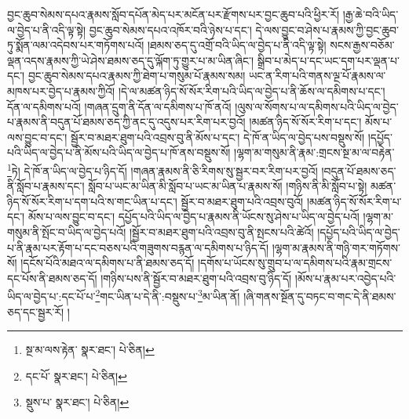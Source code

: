 བྱང་ཆུབ་སེམས་དཔའ་རྣམས་སློབ་དཔོན་མེད་པར་མངོན་པར་རྫོགས་པར་བྱང་ཆུབ་པའི་ཕྱིར་རོ། །རྒྱ་ཆེ་བའི་ཡིད་ལ་བྱེད་པ་ནི་འདི་ལྟ་སྟེ། བྱང་ཆུབ་སེམས་དཔའ་འཁོར་བའི་ཉེས་པ་དང་། དེ་ལས་བྱུང་བ་ཤེས་པ་རྣམས་ཀྱི་བྱང་ཆུབ་ཏུ་སྨོན་ལམ་འདེབས་པར་གཏོགས་པའོ། །ཐམས་ཅད་དུ་འགྲོ་བའི་ཡིད་ལ་བྱེད་པ་ནི་འདི་ལྟ་སྟེ། སངས་རྒྱས་བཅོམ་ལྡན་འདས་རྣམས་ཀྱི་ཡེ་ཤེས་ཐམས་ཅད་དུ་ལྐོག་ཏུ་གྱུར་པ་མ་ཡིན་ཞིང་། སྒྲིབ་པ་མེད་པ་དང་ཡང་དག་པར་ལྡན་པ་དང་། བྱང་ཆུབ་སེམས་དཔའ་རྣམས་ཀྱི་ཐེག་པ་གསུམ་པོ་རྣམས་སམ། ཡང་ན་རིག་པའི་གནས་ལྔ་པོ་རྣམས་ལ་མཁས་པར་བྱེད་པ་རྣམས་ཀྱིའོ། །དེ་ལ་མཚན་ཉིད་སོ་སོར་རིག་པའི་ཡིད་ལ་བྱེད་པ་ནི་ཆོས་ལ་དམིགས་པ་དང་། དོན་ལ་དམིགས་པའོ། །གཞན་དྲུག་ནི་དོན་ལ་དམིགས་པ་ཁོ་ནའོ། །ལུས་ལ་སོགས་པ་ལ་དམིགས་པའི་ཡིད་ལ་བྱེད་པ་རྣམས་ནི་བདུན་པོ་ཐམས་ཅད་ཀྱི་ནང་དུ་འདུས་པར་རིག་པར་བྱའོ། །མཚན་ཉིད་སོ་སོར་རིག་པ་དང་། མོས་པ་ལས་བྱུང་བ་དང་། སྦྱོར་བ་མཐར་ཐུག་པའི་འབྲས་བུ་ནི་མོས་པ་དང་། དེ་ཁོ་ན་ཡིད་ལ་བྱེད་པས་བསྡུས་སོ། །དཔྱོད་པའི་ཡིད་ལ་བྱེད་པ་ནི་མོས་པའི་ཡིད་ལ་བྱེད་པ་ཁོ་ནས་བསྡུས་སོ། །ལྷག་མ་གསུམ་ནི་རྣམ་:གྲངས་སྔ་མ་ལ་བརྟེན་\footnote{སྔ་མ་ལས་རྟེན་  སྣར་ཐང་།  པེ་ཅིན། }ཏེ། དེ་ཁོ་ན་ཡིད་ལ་བྱེད་པ་ཉིད་དོ། །གཞན་རྣམས་ནི་ཅི་རིགས་སུ་སྦྱར་བར་རིག་པར་བྱའོ། །བདུན་པོ་ཐམས་ཅད་ནི་སློབ་པ་རྣམས་དང་། སློབ་པ་ཡང་མ་ཡིན་མི་སློབ་པ་ཡང་མ་ཡིན་པ་རྣམས་སོ། །གཉིས་ནི་མི་སློབ་པ་སྟེ། མཚན་ཉིད་སོ་སོར་རིག་པ་དག་པའི་ས་གང་ཡིན་པ་དང་། སྦྱོར་བ་མཐར་ཐུག་པའི་འབྲས་བུའོ། །མཚན་ཉིད་སོ་སོར་རིག་པ་དང་། མོས་པ་ལས་བྱུང་བ་དང་། དཔྱོད་པའི་ཡིད་ལ་བྱེད་པ་རྣམས་ནི་ཡོངས་སུ་ཤེས་པ་ཡིད་ལ་བྱེད་པའོ། །ལྷག་མ་གསུམ་ནི་སྤོང་བ་ཡིད་ལ་བྱེད་པའོ། །སྦྱོར་བ་མཐར་ཐུག་པའི་འབྲས་བུ་ནི་སྤངས་པའི་ཚེའོ། །དཔྱོད་པའི་ཡིད་ལ་བྱེད་པ་ནི་རྣམ་པར་རྟོག་པ་དང་བཅས་པའི་གཟུགས་བརྙན་ལ་དམིགས་པ་ཉིད་དོ། །ལྷག་མ་རྣམས་ནི་གཉི་གར་གཏོགས་སོ། །དངོས་པོའི་མཐའ་ལ་དམིགས་པ་ནི་ཐམས་ཅད་དོ། །དགོས་པ་ཡོངས་སུ་གྲུབ་པ་ལ་དམིགས་པའི་རྣམ་གྲངས་དང་པོས་ནི་ཐམས་ཅད་དོ། །གཉིས་པས་ནི་སྦྱོར་བ་མཐར་ཐུག་པའི་འབྲས་བུ་ཉིད་དོ། །མོས་པ་རྣམ་པར་འབྱེད་པའི་ཡིད་ལ་བྱེད་པ་:དང་པོ་པ་\footnote{དང་པོ་  སྣར་ཐང་།  པེ་ཅིན། }གང་ཡིན་པ་དེ་ནི་:བསྡུས་པ་\footnote{སྡུས་པ་  སྣར་ཐང་།  པེ་ཅིན། }མ་ཡིན་ནོ། །ཞི་གནས་སྔོན་དུ་བཏང་བ་གང་དེ་ནི་ཐམས་ཅད་དང་སྦྱར་རོ། །
